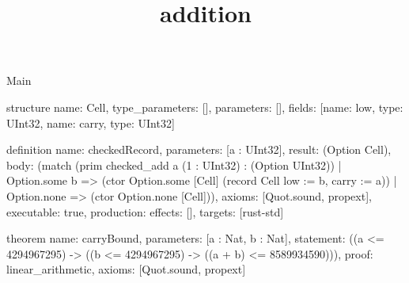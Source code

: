 \begin{lexlean}{Main}
\title{addition}
\begin{semanticmodule}
structure{
  name: Cell,
  type_parameters: [],
  parameters: [],
  fields: [{name: low, type: UInt32}, {name: carry, type: UInt32}]
}

definition{
  name: checkedRecord,
  parameters: [a : UInt32],
  result: (Option Cell),
  body: (match (prim checked_add a (1 : UInt32) : (Option UInt32))
    | Option.some b => (ctor Option.some [Cell] (record Cell {low := b, carry := a}))
    | Option.none => (ctor Option.none [Cell])),
  axioms: [Quot.sound, propext],
  executable: true,
  production: {effects: [], targets: [rust-std]}
}

theorem{
  name: carryBound,
  parameters: [a : Nat, b : Nat],
  statement: ((a <= 4294967295) -> ((b <= 4294967295) -> ((a + b) <= 8589934590))),
  proof: linear_arithmetic{},
  axioms: [Quot.sound, propext]
}
\end{semanticmodule}
\end{lexlean}
